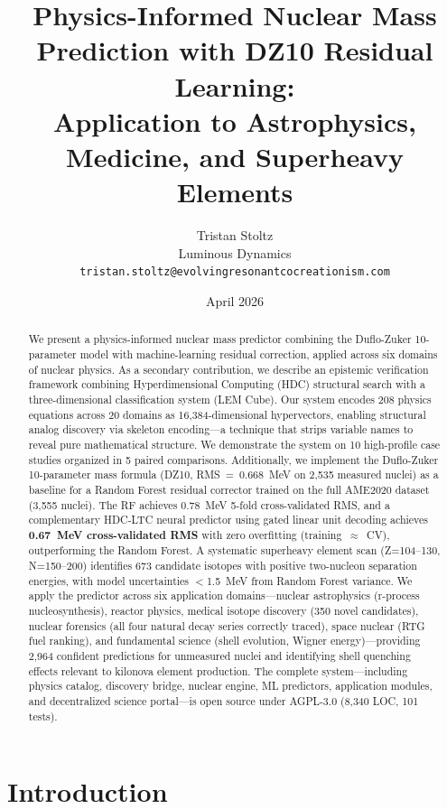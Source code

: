 \documentclass[letterpaper,11pt]{article}
\title{Physics-Informed Nuclear Mass Prediction with DZ10 Residual Learning:\\
Application to Astrophysics, Medicine, and Superheavy Elements}
\author{
Tristan Stoltz \\
Luminous Dynamics \\
\texttt{tristan.stoltz@evolvingresonantcocreationism.com}
}
\date{April 2026}
\begin{document}
\maketitle

\begin{abstract}
We present a physics-informed nuclear mass predictor combining the Duflo-Zuker
10-parameter model with machine-learning residual correction, applied across six
domains of nuclear physics. As a secondary contribution, we describe an epistemic
verification framework combining Hyperdimensional Computing (HDC) structural
search with a three-dimensional classification system (LEM Cube). Our system encodes 208 physics equations across 20 domains as
16,384-dimensional hypervectors, enabling structural analog discovery via
skeleton encoding---a technique that strips variable names to reveal pure
mathematical structure. We demonstrate the system on 10 high-profile case
studies organized in 5 paired comparisons. Additionally, we implement the
Duflo-Zuker 10-parameter mass formula (DZ10, RMS~=~0.668~MeV on 2,535 measured
nuclei) as a baseline for a Random Forest residual corrector trained on the full
AME2020 dataset (3,555 nuclei). The RF achieves 0.78~MeV 5-fold
cross-validated RMS, and a complementary HDC-LTC neural predictor using gated
linear unit decoding achieves \textbf{0.67~MeV cross-validated RMS} with zero
overfitting (training~$\approx$~CV), outperforming the Random Forest. A systematic superheavy
element scan (Z=104--130, N=150--200) identifies 673 candidate isotopes with
positive two-nucleon separation energies, with model uncertainties $<$1.5~MeV
from Random Forest variance. We apply the predictor across six application
domains---nuclear astrophysics (r-process nucleosynthesis), reactor physics,
medical isotope discovery (350 novel candidates), nuclear forensics (all four
natural decay series correctly traced), space nuclear (RTG fuel ranking), and
fundamental science (shell evolution, Wigner energy)---providing 2,964 confident
predictions for unmeasured nuclei and identifying shell quenching effects
relevant to kilonova element production. The complete system---including physics
catalog, discovery bridge, nuclear engine, ML predictors, application modules,
and decentralized science portal---is open source under AGPL-3.0 (8,340 LOC,
101 tests).
\end{abstract}

\section{Introduction}
\end{document}

